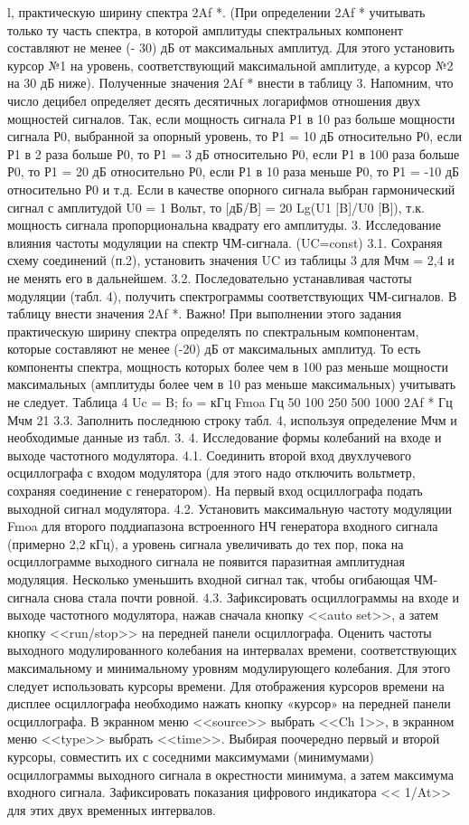 ﻿\documentclass[a4paper,12pt]{article}
\begin{document}
l,	практическую ширину спектра 2Af *.
(При определении 2Af * учитывать только ту часть спектра, в которой амплитуды спектральных компонент составляют не менее (- 30) дБ от максимальных амплитуд. Для этого установить курсор №1 на уровень, соответствующий максимальной амплитуде, а курсор №2 на 30 дБ ниже).
Полученные значения 2Af * внести в таблицу 3.
Напомним, что число децибел определяет десять десятичных логарифмов отношения двух мощностей сигналов. Так, если мощность сигнала Р1 в 10 раз больше мощности сигнала Р0, выбранной за опорный уровень, то Р1 = 10 дБ относительно Р0, если Р1 в 2 раза больше Р0, то Р1 = 3 дБ относительно Р0, если Р1 в 100 раза больше Р0, то Р1 = 20 дБ относительно Р0, если Р1 в 10 раза меньше Р0, то Р1 = -10 дБ относительно Р0 и т.д. Если в качестве опорного сигнала выбран гармонический сигнал с амплитудой U0 = 1 Вольт, то [дБ/В] = 20 Lg(U1 [B]/U0 [В]), т.к. мощность сигнала пропорциональна квадрату его амплитуды.
3.	Исследование влияния частоты модуляции на спектр ЧМ-сигнала. (UC=const)
3.1.	Сохраняя схему соединений (п.2), установить значения UC из таблицы 3 для Мчм = 2,4 и не менять его в дальнейшем.
3.2.	Последовательно устанавливая частоты модуляции (табл. 4), получить спектрограммы соответствующих ЧМ-сигналов. В таблицу внести значения 2Af *. Важно! При выполнении этого задания практическую ширину спектра определять по спектральным компонентам, которые составляют не менее (-20) дБ от максимальных амплитуд. То есть компоненты спектра, мощность которых более чем в 100 раз меньше мощности максимальных (амплитуды более чем в 10 раз меньше максимальных) учитывать не следует.
Таблица 4
Uc =	 B; fo =	 кГц						
Fmoa	Гц	50	100	250	500	1000
2Af *	Гц					
Мчм						
21
3.3.	Заполнить последнюю строку табл. 4, используя определение Мчм и необходимые данные из табл. 3.
4.	Исследование формы колебаний на входе и выходе частотного модулятора.
4.1.	Соединить второй вход двухлучевого осциллографа с входом модулятора (для этого надо отключить вольтметр, сохраняя соединение с генератором). На первый вход осциллографа подать выходной сигнал модулятора.
4.2.	Установить максимальную частоту модуляции Fmoa для второго поддиапазона встроенного НЧ генератора входного сигнала (примерно 2,2 кГц), а уровень сигнала увеличивать до тех пор, пока на осциллограмме выходного сигнала не появится паразитная амплитудная модуляция. Несколько уменьшить входной сигнал так, чтобы огибающая ЧМ-сигнала снова стала почти ровной.
4.3.	Зафиксировать осциллограммы на входе и выходе частотного модулятора, нажав сначала кнопку <<auto set>>, а затем кнопку <<run/stop>> на передней панели осциллографа. Оценить частоты выходного модулированного колебания на интервалах времени, соответствующих максимальному и минимальному уровням модулирующего колебания. Для этого следует использовать курсоры времени. Для отображения курсоров времени на дисплее осциллографа необходимо нажать кнопку «курсор» на передней панели осциллографа. В экранном меню <<source>> выбрать <<Ch 1>>, в экранном меню <<type>> выбрать <<time>>. Выбирая поочередно первый и второй курсоры, совместить их с соседними максимумами (минимумами) осциллограммы выходного сигнала в окрестности минимума, а затем максимума входного сигнала. Зафиксировать показания цифрового индикатора << 1/At>> для этих двух временных интервалов.
\end{document}
